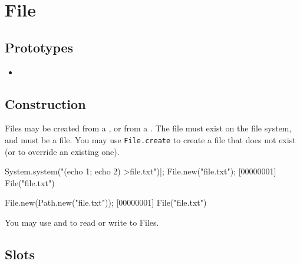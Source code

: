 \section{File}

\subsection{Prototypes}
\begin{itemize}
\item {}
\end{itemize}

\subsection{Construction}

Files may be created from a , or from a
.  The file must exist on the file system, and must be
a file.  You may use \lstinline|File.create| to create a file that
does not exist (or to override an existing one).

\begin{urbiscript}
System.system("(echo 1; echo 2) >file.txt")|;
File.new("file.txt");
[00000001] File("file.txt")

File.new(Path.new("file.txt"));
[00000001] File("file.txt")
\end{urbiscript}

You may use  and  to
read or write to Files.

\subsection{Slots}

